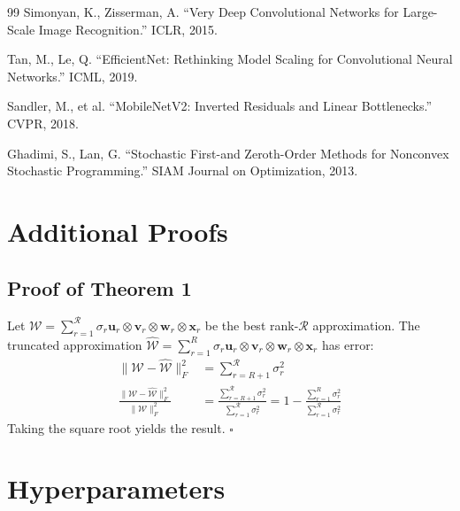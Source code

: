 \documentclass[10pt,twocolumn,letterpaper]{article}
\begin{document}
\begin{thebibliography}{99}
Simonyan, K., Zisserman, A. ``Very Deep Convolutional Networks for Large-Scale Image Recognition.'' ICLR, 2015.

Tan, M., Le, Q. ``EfficientNet: Rethinking Model Scaling for Convolutional Neural Networks.'' ICML, 2019.

Sandler, M., et al. ``MobileNetV2: Inverted Residuals and Linear Bottlenecks.'' CVPR, 2018.

Ghadimi, S., Lan, G. ``Stochastic First-and Zeroth-Order Methods for Nonconvex Stochastic Programming.'' SIAM Journal on Optimization, 2013.

\end{thebibliography}

\appendix

\section{Additional Proofs}
\label{app:proofs}

\subsection{Proof of Theorem 1}
Let $\mathcal{W} = \sum_{r=1}^{\mathcal{R}} \sigma_r \mathbf{u}_r \otimes \mathbf{v}_r \otimes \mathbf{w}_r \otimes \mathbf{x}_r$ be the best rank-$\mathcal{R}$ approximation. The truncated approximation $\hat{\mathcal{W}} = \sum_{r=1}^{R} \sigma_r \mathbf{u}_r \otimes \mathbf{v}_r \otimes \mathbf{w}_r \otimes \mathbf{x}_r$ has error:
\begin{align}
\|\mathcal{W} - \hat{\mathcal{W}}\|_F^2 &= \sum_{r=R+1}^{\mathcal{R}} \sigma_r^2 \\
\frac{\|\mathcal{W} - \hat{\mathcal{W}}\|_F^2}{\|\mathcal{W}\|_F^2} &= \frac{\sum_{r=R+1}^{\mathcal{R}} \sigma_r^2}{\sum_{r=1}^{\mathcal{R}} \sigma_r^2} = 1 - \frac{\sum_{r=1}^{R} \sigma_r^2}{\sum_{r=1}^{\mathcal{R}} \sigma_r^2}
\end{align}
Taking the square root yields the result. $\square$

\section{Hyperparameters}
\label{app:hyperparams}
\end{document}
